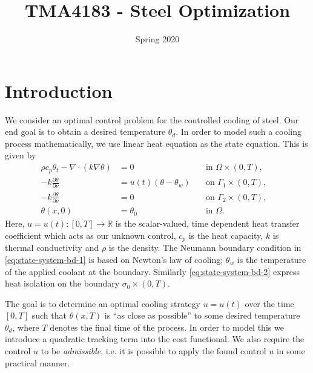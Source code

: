 \documentclass{article}
\title{TMA4183 - Steel Optimization}
\author{}
\date{Spring 2020}
\begin{document}
\maketitle

\section{Introduction}
We consider an optimal control problem for the controlled cooling of steel. Our end goal is to obtain a desired temperature $\theta_d$. In order to model such a cooling process mathematically, we use linear heat equation as the state equation. This is given by
\begin{subequations}
   \label{eq:heat}
   \begin{align}
      \rho c_p \theta_t - \nabla \cdot (k \nabla \theta) &= 0 \quad &\text{in } \Omega \times (0,T),\label{eq:heat-in-omega} \\
      -k \frac{\partial \theta}{\partial \nu} &= u(t) (\theta - \theta_w) \quad &\text{on } \Gamma_1 \times (0,T), \label{eq:state-system-bd-1} \\
      -k \frac{\partial \theta}{\partial \nu} &= 0 \quad &\text{on } \Gamma_2 \times (0,T), \label{eq:state-system-bd-2} \\
      \theta(x, 0) &= \theta_0 &\text{in } \Omega. &
   \end{align}
\end{subequations}
Here, $u = u(t) \colon [0, T] \to \mathbb{R}$ is the scalar-valued, time dependent heat transfer coefficient which acts as our unknown control, $c_p$ is the heat capacity, $k$ is thermal conductivity and $\rho$ is the density. The Neumann boundary condition in \eqref{eq:state-system-bd-1} is based on Newton's law of cooling; $\theta_w$ is the temperature of the applied coolant at the boundary. Similarly \eqref{eq:state-system-bd-2} express heat isolation on the boundary $\sigma_0 \times (0,T)$. \bigskip 

The goal is to determine an optimal cooling strategy $u=u(t)$ over the time $[0,T]$ such that $\theta(x, T)$ is ``as close as possible'' to some desired temperature $\theta_d$, where $T$ denotes the final time of the process. In order to model this we introduce a quadratic tracking term into the cost functional. We also require the control $u$ to be \emph{admissible}, i.e. it is possible to apply the found control $u$ in some practical manner.
\end{document}
